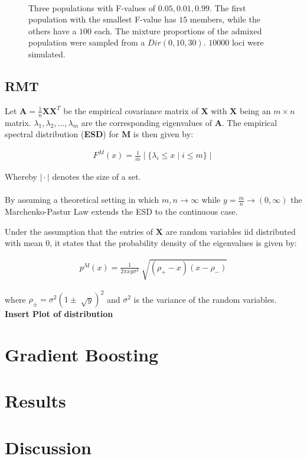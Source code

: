 \documentclass[a4paper, 11pt]{article}
\begin{document}
\begin{figure}[h!]
\\Three populations with F-values  of $0.05, 0.01, 0.99$. The first population with the smallest F-value has $15$ members, while the others have a $100$ each. The mixture proportions of the admixed population were sampled from a $Dir(0, 10, 30)$. $10000$ loci were simulated.

\centering
\end{figure}


\newpage

\subsection{RMT}

Let $\mathbf{A} = \frac{1}{n}\mathbf{X}\mathbf{X}^{T}$ be the empirical covariance matrix of $\mathbf{X}$ with $\mathbf{X}$ being an $m \times n$ matrix. $\lambda_{1},\lambda_{2}, \dots, \lambda_{m}$ are the corresponding eigenvalues of $\mathbf{A}$. The empirical spectral distribution (\textbf{ESD}) for  $\mathbf{M}$ is then given by:

\begin{align*}
F^{M}(x) = \frac{1}{m} \mid \{\lambda_{i} \leq x \mid i \leq m\} \mid
\end{align*}

Whereby $\mid \cdot \mid$ denotes the size of a set.
\\
\\
By assuming a theoretical setting in which $m, n \rightarrow \infty$ while $y = \frac{m}{n} \rightarrow (0, \infty)$ the Marchenko-Pastur Law extends the ESD to the continuous case.

Under the assumption that the entries of $\mathbf{X}$ are random variables iid distributed with mean $0$, it states that the probability density of the eigenvalues is given by:

\begin{align*}
p^{M}(x) = \frac{1}{2\pi xy \sigma^{2}}  \sqrt[]{(\rho_{+} - x)(x - \rho_{-})}
\end{align*}

where $\rho_{\pm} = \sigma^{2}(1 \pm \sqrt[]{y})^{2}$ and $\sigma^2$ is the variance of the random variables.
\\
\textbf{Insert Plot of distribution}
\\

\newpage

\section{Gradient Boosting}

\section{Results}

\section{Discussion}

\printbibliography
\end{document}
